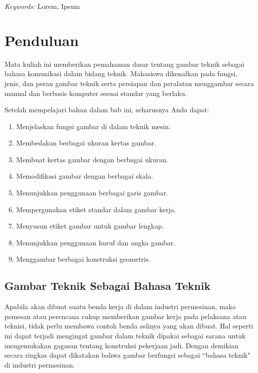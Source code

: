 \documentclass[11pt]{simart} %
\begin{document}
\hspace*{3.6mm}\textit{Keywords:} Lorem, Ipsum %

\vspace{30pt} %

% 

\section{Penduluan}%
\label{sec:Penduluan}

Mata kuliah ini memberikan pemahaman dasar tentang gambar teknik sebagai bahasa komunikasi dalam bidang teknik. Mahasiswa dikenalkan pada fungsi, jenis, dan peran gambar teknik serta persiapan dan peralatan menggambar secara manual dan berbasis komputer sesuai standar yang berlaku.

Setelah mempelajari bahan dalam bab ini, seharusnya Anda dapat:
\begin{enumerate}
	\item Menjelaskan fungsi gambar di dalam teknik mesin.
	\item Membedakan berbagai ukuran kertas gambar.
	\item Membuat kertas gambar dengan berbagai ukuran.
	\item Memodifikasi gambar dengan berbagai skala.
	\item Menunjukkan penggunaan berbagai garis gambar.
	\item Mempergunakan etiket standar dalam gambar kerja.
	\item Menyusun etiket gambar untuk gambar lengkap.
	\item Menunjukkan penggunaan huruf dan angka gambar.
	\item Menggambar berbagai konstruksi geometris.
\end{enumerate}

\subsection{Gambar Teknik Sebagai Bahasa Teknik}%
\label{sub:Gambar Teknik Sebagai Bahasa Teknik}

Apabila akan dibuat suatu benda kerja di dalam industri permesinan, maka pemesan atau perencana cukup memberikan gambar kerja pada pelaksana atau teknisi, tidak perlu membawa contoh benda aslinya yang akan dibuat. Hal seperti ini dapat terjadi mengingat gambar dalam teknik dipakai sebagai sarana untuk mengemukakan gagasan tentang konstruksi pekerjaan jadi. Dengan demikian secara ringkas dapat dikatakan bahwa gambar berfungsi sebagai ``bahasa teknik" di industri permesinan.
\end{document}
